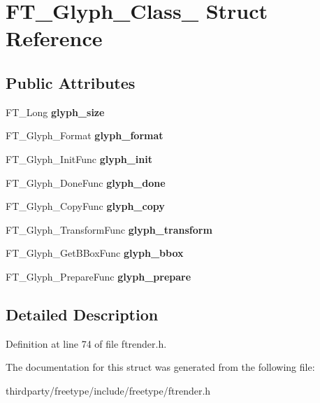 \hypertarget{struct_f_t___glyph___class__}{}\section{F\+T\+\_\+\+Glyph\+\_\+\+Class\+\_\+ Struct Reference}
\label{struct_f_t___glyph___class__}
\subsection*{Public Attributes}
\begin{DoxyCompactItemize}
\item 
\mbox{\label{struct_f_t___glyph___class___a1a76c68b9fb0e93947e888c0fe77cbf8}} 
F\+T\+\_\+\+Long {\bfseries glyph\+\_\+size}
\item 
\mbox{\label{struct_f_t___glyph___class___a26738bd14d5845e18d09ccaa3a709d23}} 
F\+T\+\_\+\+Glyph\+\_\+\+Format {\bfseries glyph\+\_\+format}
\item 
\mbox{\label{struct_f_t___glyph___class___a657200ad15ff061b38fb25b168737f95}} 
F\+T\+\_\+\+Glyph\+\_\+\+Init\+Func {\bfseries glyph\+\_\+init}
\item 
\mbox{\label{struct_f_t___glyph___class___aabf05a4368dccacf45e1a54e542e5d63}} 
F\+T\+\_\+\+Glyph\+\_\+\+Done\+Func {\bfseries glyph\+\_\+done}
\item 
\mbox{\label{struct_f_t___glyph___class___afc78dcdc4802760ebcaccf3a7b6cd088}} 
F\+T\+\_\+\+Glyph\+\_\+\+Copy\+Func {\bfseries glyph\+\_\+copy}
\item 
\mbox{\label{struct_f_t___glyph___class___a5f72ac1d0d92eb31fa3e2bb721a97ef2}} 
F\+T\+\_\+\+Glyph\+\_\+\+Transform\+Func {\bfseries glyph\+\_\+transform}
\item 
\mbox{\label{struct_f_t___glyph___class___a06bfad431865c6731305cb781f78b317}} 
F\+T\+\_\+\+Glyph\+\_\+\+Get\+B\+Box\+Func {\bfseries glyph\+\_\+bbox}
\item 
\mbox{\label{struct_f_t___glyph___class___af7f406e5ea20a6614c946746938830c9}} 
F\+T\+\_\+\+Glyph\+\_\+\+Prepare\+Func {\bfseries glyph\+\_\+prepare}
\end{DoxyCompactItemize}


\subsection{Detailed Description}


Definition at line 74 of file ftrender.\+h.



The documentation for this struct was generated from the following file\+:\begin{DoxyCompactItemize}
\item 
thirdparty/freetype/include/freetype/ftrender.\+h\end{DoxyCompactItemize}

